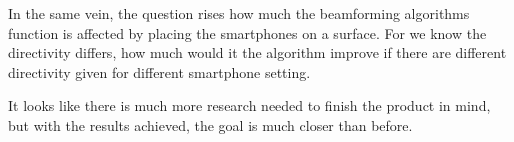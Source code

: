 In the same vein, the question rises how much the beamforming algorithms function is affected by placing the smartphones on a surface.
For we know the directivity differs, how much would it the algorithm improve if there are different directivity given for different smartphone setting.

It looks like there is much more research needed to finish the product in mind, but with the results achieved, the goal is much closer than before.